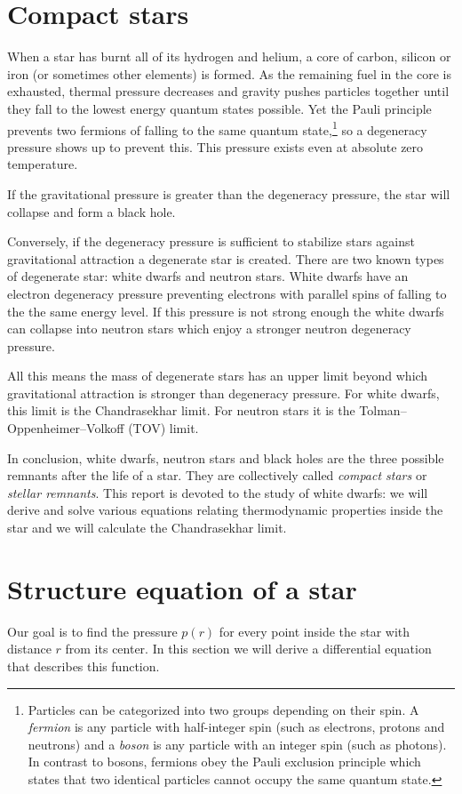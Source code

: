 \documentclass[a4paper]{article}
\begin{document}
\section{Compact stars} \label{sec:compactstars}
When a star has burnt all of its hydrogen and helium, a core of carbon, silicon or iron (or sometimes other elements) is formed. As the remaining fuel in the core is exhausted, thermal pressure decreases and gravity pushes particles together until they fall to the lowest energy quantum states possible. Yet the Pauli principle prevents two fermions of falling to the same quantum state,\footnote{Particles can be categorized into two groups depending on their spin. A \textit{fermion} is any particle with half-integer spin (such as electrons, protons and neutrons) and a \textit{boson} is any particle with an integer spin (such as photons). In contrast to bosons, fermions obey the Pauli exclusion principle which states that two identical particles cannot occupy the same quantum state.} so a degeneracy pressure shows up to prevent this. This pressure exists even at absolute zero temperature.

If the gravitational pressure is greater than the degeneracy pressure, the star will collapse and form a black hole.

Conversely, if the degeneracy pressure is sufficient to stabilize stars against gravitational attraction a degenerate star is created. There are two known types of degenerate star: white dwarfs and neutron stars. White dwarfs have an electron degeneracy pressure preventing electrons with parallel spins of falling to the the same energy level. If this pressure is not strong enough the white dwarfs can collapse into neutron stars which enjoy a stronger neutron degeneracy pressure. 

All this means the mass of degenerate stars has an upper limit beyond which gravitational attraction is stronger than degeneracy pressure. For white dwarfs, this limit is the Chandrasekhar limit. For neutron stars it is the Tolman–Oppenheimer–Volkoff (TOV) limit.

In conclusion, white dwarfs, neutron stars and black holes are the three possible remnants after the life of a star. They are collectively called \textit{compact stars} or \textit{stellar remnants}. This report is devoted to the study of white dwarfs: we will derive and solve various equations relating thermodynamic properties inside the star and we will calculate the Chandrasekhar limit.

\section{Structure equation of a star} \label{sec:structureeq}
 Our goal is to find the pressure $p(r)$ for every point inside the star with distance $r$ from its center. In this section we will derive a differential equation that describes this function.
\end{document}
